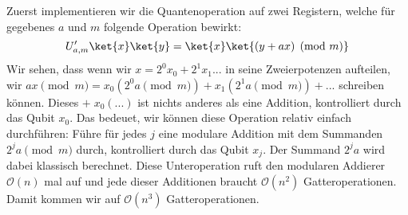 \noindent Zuerst implementieren wir die Quantenoperation auf zwei Registern, welche für gegebenes $a$ und $m$ folgende Operation bewirkt: $$U'_{a, m}\ket{x}\ket{y} = \ket{x}\ket{(y + ax) \pmod{m}}$$
Wir sehen, dass wenn wir $x = 2^0 x_0 + 2^1 x_1 ...$ in seine Zweierpotenzen aufteilen, wir $ax \pmod{m} = x_0(2^0 a \pmod{m}) + x_1(2^1 a \pmod{m}) + ...$ schreiben können. Dieses $+ \;x_0(...)$ ist nichts anderes als eine Addition, kontrolliert durch das Qubit $x_0$. Das bedeuet, wir können diese Operation relativ einfach durchführen: \newline
Führe für jedes $j$ eine modulare Addition mit dem Summanden $2^{j}a \pmod{m}$ durch, kontrolliert durch das Qubit $x_j$. Der Summand $2^j{a}$ wird dabei klassisch berechnet.\newline
Diese Unteroperation ruft den modularen Addierer $\mathcal O(n)$ mal auf und jede dieser Additionen braucht $\mathcal O(n^2)$ Gatteroperationen. Damit kommen wir auf $\mathcal O(n^3)$ Gatteroperationen.

\paragraph{}

